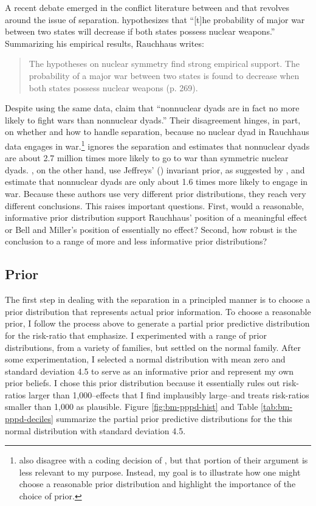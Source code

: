 \documentclass[12pt]{article}
\begin{document}
A recent debate emerged in the conflict literature between \cite{Rauchhaus2009} and \cite{BellMiller2014} that revolves around the issue of separation. \citet[p. 262]{Rauchhaus2009} hypothesizes that ``[t]he probability of major war between two states will decrease if both states possess nuclear weapons.'' Summarizing his empirical results, Rauchhaus writes:

\begin{quote} 
The hypotheses on nuclear symmetry find strong empirical support. The probability of a major war between two states is found to decrease when both states possess nuclear weapons (p. 269).
\end{quote}

Despite using the same data, \citet[p. 9]{BellMiller2014} claim that ``nonnuclear dyads are in fact no more likely to fight wars than nonnuclear dyads.'' Their disagreement hinges, in part, on whether and how to handle separation, because no nuclear dyad in Rauchhaus data engages in war.\footnote{\cite{BellMiller2014} also disagree with a coding decision of \cite{Rauchhaus2009}, but that portion of their argument is less relevant to my purpose. Instead, my goal is to illustrate how one might choose a reasonable prior distribution and highlight the importance of the choice of prior.} \cite{Rauchhaus2009} ignores the separation and estimates that nonnuclear dyads are about 2.7 million times more likely to go to war than symmetric nuclear dyads. \cite{BellMiller2014}, on the other hand, use Jeffreys' (\citeyear{Jeffreys1946}) invariant prior, as suggested by \cite{Zorn2005}, and estimate that nonnuclear dyads are only about 1.6 times more likely to engage in war. Because these authors use very different prior distributions, they reach very different conclusions. This raises important questions. First, would a reasonable, informative prior distribution support Rauchhaus' position of a meaningful effect or Bell and Miller's position of essentially no effect? Second, how robust is the conclusion to a range of more and less informative prior distributions?

\subsection*{Prior}

The first step in dealing with the separation in a principled manner is to choose a prior distribution that represents actual prior information. To choose a reasonable prior, I follow the process above to generate a partial prior predictive distribution for the risk-ratio that \cite{BellMiller2014} emphasize. I experimented with a range of prior distributions, from a variety of families, but settled on the normal family. After some experimentation, I selected a normal distribution with mean zero and standard deviation 4.5 to serve as an informative prior and represent my own prior beliefs. I chose this prior distribution because it essentially rules out risk-ratios larger than 1,000--effects that I find implausibly large--and treats risk-ratios smaller than 1,000 as plausible. Figure \ref{fig:bm-pppd-hist} and Table \ref{tab:bm-pppd-deciles} summarize the partial prior predictive distributions for the this normal distribution with standard deviation 4.5.
\end{document}
